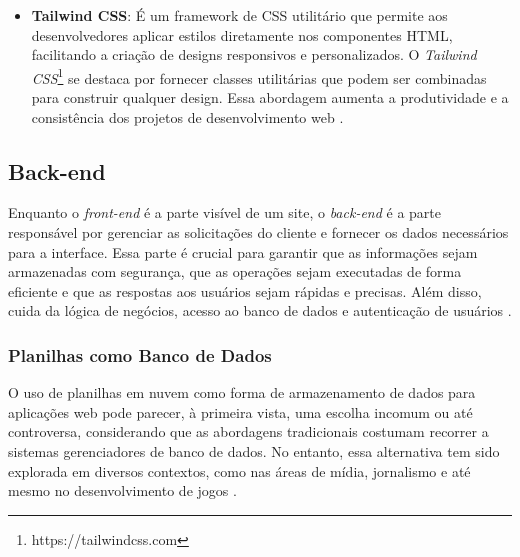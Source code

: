 \begin{itemize}
\begin{itemize}
        \item \textbf{Next.js}: É um \textit{framework} \textit{React} de código aberto hospedado no \textit{GitHub} sob a licença MIT, com foco em produção e eficiência, criado e mantido pela equipe da \textit{Vercel} \cite{nextjs2025}. O \textit{Next.js}\footnote{https://nextjs.org} tem se destacado por sua capacidade de renderização no lado servidor (SSR), melhorando significativamente o tempo de carregamento das páginas e a otimização para motores de busca \cite{RenanNextjs2024}. Ademais, oferece recursos como geração de site estático (SSG), roteamento baseado em sistema de arquivos, suporte a CSS e SASS incorporados, além de suportar \textit{TypeScript}. Sua flexibilidade permite que os desenvolvedores escolham entre SSR, SSG ou uma combinação de ambos, dependendo das necessidades do projeto \cite{RenanNextjs2024}.
    \end{itemize}
    \item \textbf{Tailwind CSS}: É um framework de CSS utilitário que permite aos desenvolvedores aplicar estilos diretamente nos componentes HTML, facilitando a criação de designs responsivos e personalizados. O \textit{Tailwind CSS}\footnote{https://tailwindcss.com} se destaca por fornecer classes utilitárias que podem ser combinadas para construir qualquer design. Essa abordagem aumenta a produtividade e a consistência dos projetos de desenvolvimento web \cite{bosco2024crefide}.
\end{itemize}

\subsection{Back-end}

Enquanto o \textit{front-end} é a parte visível de um site, o \textit{back-end} é a parte responsável por gerenciar as solicitações do cliente e fornecer os dados necessários para a interface. Essa parte é crucial para garantir que as informações sejam armazenadas com segurança, que as operações sejam executadas de forma eficiente e que as respostas aos usuários sejam rápidas e precisas. Além disso, cuida da lógica de negócios, acesso ao banco de dados e autenticação de usuários \cite{garcia2024plataforma}.

\subsubsection{Planilhas como Banco de Dados}

O uso de planilhas em nuvem como forma de armazenamento de dados para aplicações web pode parecer, à primeira vista, uma escolha incomum ou até controversa, considerando que as abordagens tradicionais costumam recorrer a sistemas gerenciadores de banco de dados. No entanto, essa alternativa tem sido explorada em diversos contextos, como nas áreas de mídia, jornalismo e até mesmo no desenvolvimento de jogos \cite{schwertnercharao:hal-02119998}.

